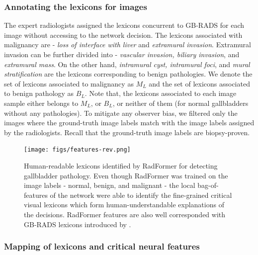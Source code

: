 \documentclass[twocolumn,final]{elsarticle}
\def\myarch{RadFormer\xspace}
\begin{document}
\subsubsection{Annotating the lexicons for images}
The expert radiologists assigned the lexicons concurrent to GB-RADS for each image without accessing to the network decision. The lexicons associated with malignancy are - \emph{loss of interface with liver} and \emph{extramural invasion}. Extramural invasion can be further divided into - \emph{vascular invasion, biliary invasion}, and \emph{extramural mass}. On the other hand, \emph{intramural cyst, intramural foci}, and \emph{mural stratification} are the lexicons corresponding to benign pathologies. We denote the set of lexicons associated to malignancy as $M_L$ and the set of lexicons associated to benign pathology as $B_L$. Note that, the lexicons associated to each image sample either belongs to $M_L$, or $B_L$, or neither of them (for normal gallbladders without any pathologies). To mitigate any observer bias, we filtered only the images where the ground-truth image labels match with the image labels assigned by the radiologists. Recall that the ground-truth image labels are biopsy-proven. 

\begin{figure}[t]
    \centering
    \texttt{[image: figs/features-rev.png]}
    \caption{Human-readable lexicons identified by \myarch for detecting gallbladder pathology. Even though \myarch was trained on the image labels - normal, benign, and malignant - the local bag-of-features of the network were able to identify the fine-grained critical visual lexicons which form human-understandable explanations of the decisions. \myarch features are also well corresponded with GB-RADS lexicons introduced by \cite{gb-rads-paper}. }
    \label{fig:rads_features}
\end{figure}

\subsubsection{Mapping of lexicons and critical neural features}
\end{document}
